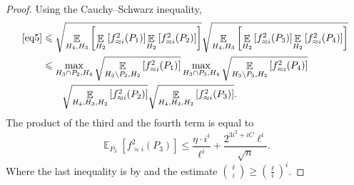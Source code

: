 \documentclass{toc}
\newcommand\Expect[2]{{\mathop{\mathbb{E}}_{#1}\left[ {#2} \right]}}
\renewcommand\geq{\geqslant}
\renewcommand\leq{\leqslant}
\newcommand\approxlvlfn[2]{{#1}_{\approx{#2}}}
\begin{document}
\begin{proof}
Using the Cauchy--Schwarz inequality,
\begin{align}\label{eq6}
\eqref{eq5}
&\leq
\sqrt{\Expect{H_4, H_3}{
\Expect{H_{2}}{\approxlvlfn{f}{i}^2(P_1)}
\Expect{H_{2}}{\approxlvlfn{f}{i}^2(P_2)}}}
\sqrt{\Expect{H_4, H_3}{
\Expect{H_{2}}{\approxlvlfn{f}{i}^2(P_3)}
\Expect{H_{2}}{\approxlvlfn{f}{i}^2(P_4)}}}
\nonumber \\
&\leq
\max_{H_3\cap P_2,H_4}
\sqrt{\Expect{H_3\setminus P_2,H_2}{\approxlvlfn{f}{i}^2(P_1)}}
\max_{H_3\cap P_3, H_4}
\sqrt{\Expect{H_3\setminus P_3, H_{2}}{\approxlvlfn{f}{i}^2(P_4)}}
\nonumber \\
&~~~~~~
\sqrt{
\Expect{H_4,H_3,H_{2}}{\approxlvlfn{f}{i}^2(P_2)}}
\sqrt{
\Expect{H_4,H_3,H_{2}}{\approxlvlfn{f}{i}^2(P_3)}}.
\end{align}
The product of the third and the fourth term is equal to
\[
\Expect{P_3}{\approxlvlfn{f}{i}^2(P_3)}
\leq \frac{\eta \cdot i^i}{\ell^i}+\frac{2^{3i^2+iC} \ell^{i}}{\sqrt{n}}.
\]
Where the last inequality is by  and the estimate ${\ell \choose i}\geq \left(\frac{\ell}{i}\right)^i$.


\end{proof}
\end{document}
